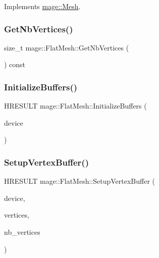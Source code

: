 Implements \hyperlink{classmage_1_1_mesh_a8ebd5d1a5159ebeda44e3fb6b98a115c}{mage\+::\+Mesh}.

\hypertarget{classmage_1_1_flat_mesh_a88f69dd4fa4a1d09db67b6cc32e909ba}{}\label{classmage_1_1_flat_mesh_a88f69dd4fa4a1d09db67b6cc32e909ba} 
\subsubsection{\texorpdfstring{Get\+Nb\+Vertices()}{GetNbVertices()}}
{\footnotesize\ttfamily size\+\_\+t mage\+::\+Flat\+Mesh\+::\+Get\+Nb\+Vertices (\begin{DoxyParamCaption}{ }\end{DoxyParamCaption}) const}

\hypertarget{classmage_1_1_flat_mesh_a494f660eae4773c91c57663cd6410c4a}{}\label{classmage_1_1_flat_mesh_a494f660eae4773c91c57663cd6410c4a} 
\subsubsection{\texorpdfstring{Initialize\+Buffers()}{InitializeBuffers()}}
{\footnotesize\ttfamily H\+R\+E\+S\+U\+LT mage\+::\+Flat\+Mesh\+::\+Initialize\+Buffers (\begin{DoxyParamCaption}\item[{I\+D3\+D11\+Device2 $\ast$}]{device }\end{DoxyParamCaption})\hspace{0.3cm}{\ttfamily [protected]}}

\hypertarget{classmage_1_1_flat_mesh_a99e9b24fee648ca2de48c794aa3fda19}{}\label{classmage_1_1_flat_mesh_a99e9b24fee648ca2de48c794aa3fda19} 
\subsubsection{\texorpdfstring{Setup\+Vertex\+Buffer()}{SetupVertexBuffer()}}
{\footnotesize\ttfamily H\+R\+E\+S\+U\+LT mage\+::\+Flat\+Mesh\+::\+Setup\+Vertex\+Buffer (\begin{DoxyParamCaption}\item[{I\+D3\+D11\+Device2 $\ast$}]{device,  }\item[{const \hyperlink{structmage_1_1_vertex}{Vertex} $\ast$}]{vertices,  }\item[{size\+\_\+t}]{nb\+\_\+vertices }\end{DoxyParamCaption})\hspace{0.3cm}{\ttfamily [protected]}}

